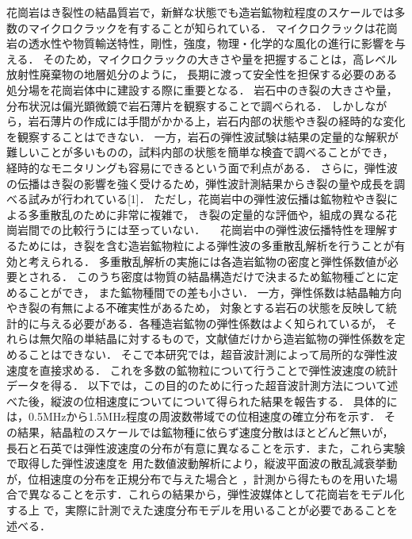 花崗岩はき裂性の結晶質岩で，新鮮な状態でも造岩鉱物粒程度のスケールでは多数のマイクロクラックを有することが知られている．
マイクロクラックは花崗岩の透水性や物質輸送特性，剛性，強度，物理・化学的な風化の進行に影響を与える．
そのため，マイクロクラックの大きさや量を把握することは，高レベル放射性廃棄物の地層処分のように，
長期に渡って安全性を担保する必要のある処分場を花崗岩体中に建設する際に重要となる．
岩石中のき裂の大きさや量，分布状況は偏光顕微鏡で岩石薄片を観察することで調べられる．
しかしながら，岩石薄片の作成には手間がかかる上，岩石内部の状態やき裂の経時的な変化を観察することはできない．
一方，岩石の弾性波試験は結果の定量的な解釈が難しいことが多いものの，試料内部の状態を簡単な検査で調べることができ，
経時的なモニタリングも容易にできるという面で利点がある．
さらに，弾性波の伝播はき裂の影響を強く受けるため，弾性波計測結果からき裂の量や成長を調べる試みが行われている[1]．
ただし，花崗岩中の弾性波伝播は鉱物粒やき裂による多重散乱のために非常に複雑で，
き裂の定量的な評価や，組成の異なる花崗岩間での比較行うには至っていない． 
　花崗岩中の弾性波伝播特性を理解するためには，き裂を含む造岩鉱物粒による弾性波の多重散乱解析を行うことが有効と考えられる．
多重散乱解析の実施には各造岩鉱物の密度と弾性係数値が必要とされる．
このうち密度は物質の結晶構造だけで決まるため鉱物種ごとに定めることができ，
また鉱物種間での差も小さい．
一方，弾性係数は結晶軸方向やき裂の有無による不確実性があるため，
対象とする岩石の状態を反映して統計的に与える必要がある．各種造岩鉱物の弾性係数はよく知られているが，
それらは無欠陥の単結晶に対するもので，文献値だけから造岩鉱物の弾性係数を定めることはできない．
そこで本研究では，超音波計測によって局所的な弾性波速度を直接求める．
これを多数の鉱物粒について行うことで弾性波速度の統計データを得る．
以下では，この目的のために行った超音波計測方法について述べた後，縦波の位相速度についてについて得られた結果を報告する．
具体的には，0.5MHzから1.5MHz程度の周波数帯域での位相速度の確立分布を示す．
その結果，結晶粒のスケールでは鉱物種に依らず速度分散はほとどんど無いが，
長石と石英では弾性波速度の分布が有意に異なることを示す．また，これら実験で取得した弾性波速度を
用た数値波動解析により，縦波平面波の散乱減衰挙動が，位相速度の分布を正規分布で与えた場合と
，計測から得たものを用いた場合で異なることを示す．これらの結果から，弾性波媒体として花崗岩をモデル化する上
で，実際に計測でえた速度分布モデルを用いることが必要であることを述べる．

